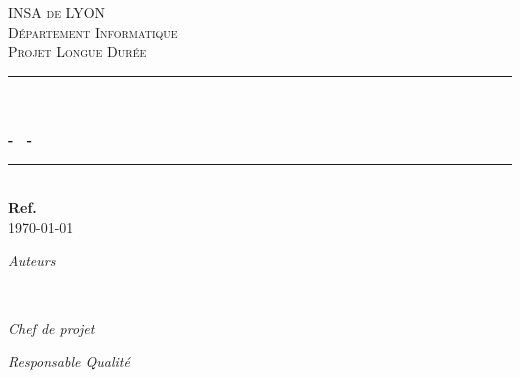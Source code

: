 \begin{titlepage}

\newcommand{\HRule}{\rule{\linewidth}{0.5mm}} %

\center %
 

\vspace*{1cm}

\textsc{\LARGE INSA de LYON}\\[1.5cm] 
\textsc{\Large D\'epartement Informatique}\\[0.5cm] 
\textsc{\large Projet Longue Durée}\\[0.5cm] %


\HRule \\[0.4cm]
{ \huge \bfseries \mainTitle}\\[0.1cm]
{\large \bfseries - \secondTitle~-} 
\HRule \\[1.5cm]


{\bf{Ref. \documentRef}}\\[0.5cm] %


{\large \today}\\[2cm] %
 

\begin{minipage}{0.4\textwidth}
\begin{center} \large
\emph{Auteurs} \\
\auteurs
\end{center}
\end{minipage}
~
\begin{minipage}{0.4\textwidth}
\begin{center} \large
\emph{Chef de projet} \\
\chefDeProjet
\end{center}
\begin{center} \large
\emph{Responsable Qualité} \\
\responsableQualite
\end{center}
\end{minipage}\\[1cm]


\end{titlepage}
